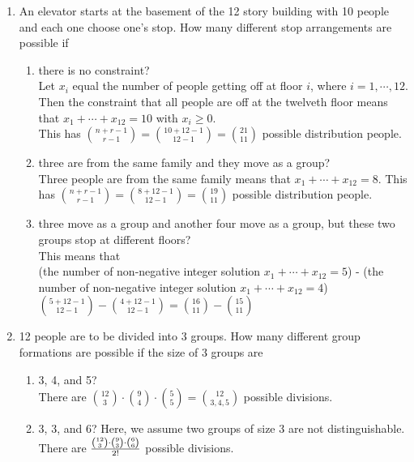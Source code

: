 \documentclass[12pt]{article}%
\newcommand{\0}{{\bf 0}}
\begin{document}
\begin{enumerate}
\item
An elevator starts at the basement of the 12 story building with 10 people
and each one choose one's stop. 
How many different stop arrangements are possible if 
\begin{enumerate}
\item there is no constraint?
\\
{\color{blue}{\bf Sol.}}
Let $x_i$ equal the number of people getting off at floor $i$, where $i = 1,\cdots,12$.
Then the constraint that all people are off at the twelveth floor means that $x_1+ \cdots +x_{12}=10$ with $x_i \ge 0 $. 
\\
This has ${n+r-1\choose r-1}={10+12-1\choose 12-1}={21\choose 11}$ possible distribution people.
\item three are from the same family and they move as a group?
\\
{\color{blue}{\bf Sol.}}
Three people are from the same family means that $x_1+ \cdots +x_{12}=8.$
This has ${n+r-1\choose r-1}={8+12-1\choose 12-1}={19\choose 11}$ possible distribution people.
\item three move as a group and another four move as a group, but these two groups stop at different floors?
\\
{\color{blue}{\bf Sol.}}
This means that \\
(the number of non-negative integer solution $x_1+ \cdots +x_{12}=5$) - (the number of non-negative integer solution $x_1+ \cdots +x_{12}=4$)\\
${5+12-1\choose 12-1}-{4+12-1\choose 12-1}={16\choose 11}-{15\choose 11}$

\end{enumerate}





\item
12 people are to be divided into 3 groups.
How many different group formations are possible if the size of 3 groups are 
\begin{enumerate}
\item 3, 4, and 5?
\\
{\color{blue}{\bf Sol.}}
There are ${12\choose 3}\cdot{9\choose 4}\cdot{5\choose 5}={12\choose 3,4,5}$ possible divisions.
\item 3, 3, and 6? {\color{red}Here, we assume two groups of size 3 are not distinguishable.}
\\
{\color{blue}{\bf Sol.}}
There are $\frac{ {12\choose 3}\cdot{9\choose 3}\cdot{6\choose 6}}{2!}$ possible divisions.


\end{enumerate}
\end{enumerate}
\end{document}
